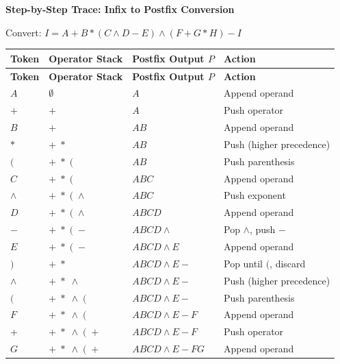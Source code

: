 \documentclass[12pt,a4paper]{article}
\renewcommand{\arraystretch}{1.45}
\begin{document}
\par\smallskip\noindent \textbf{Step-by-Step Trace: Infix to Postfix Conversion}\par\nobreak
Convert: $I = A + B * (C \wedge D - E) \wedge (F + G * H) - I$
\par\vspace{4pt}
\begingroup
\setlength{\tabcolsep}{4.5pt}
\setlength{\extrarowheight}{1.5pt}
\renewcommand{\arraystretch}{1.15}
\begingroup
\setlength{\LTleft}{0pt}
\setlength{\LTright}{0pt}
\begin{longtable}{|B{1.6cm}|B{2.8cm}|>{\small\raggedright\arraybackslash}m{\dimexpr(\linewidth-1.6cm-2.8cm-3.2cm-8\arrayrulewidth)/1\relax}|B{3.2cm}|}
\hline
\textbf{Token} & \textbf{Operator Stack} & \textbf{Postfix Output $P$} & \textbf{Action} \\
\hline
\endfirsthead
\hline
\textbf{Token} & \textbf{Operator Stack} & \textbf{Postfix Output $P$} & \textbf{Action} \\
\hline
\endhead
\hline
\endfoot
\endlastfoot
$A$ & $\emptyset$ & $A$ & Append operand \\
$+$ & $+$ & $A$ & Push operator \\
$B$ & $+$ & $A B$ & Append operand \\
$*$ & $+ \; *$ & $A B$ & Push (higher precedence) \\
$($ & $+ \; * \; ($ & $A B$ & Push parenthesis \\
$C$ & $+ \; * \; ($ & $A B C$ & Append operand \\
$\wedge$ & $+ \; * \; ( \; \wedge$ & $A B C$ & Push exponent \\
$D$ & $+ \; * \; ( \; \wedge$ & $A B C D$ & Append operand \\
$-$ & $+ \; * \; ( \; -$ & $A B C D \wedge$ & Pop $\wedge$, push $-$ \\
$E$ & $+ \; * \; ( \; -$ & $A B C D \wedge E$ & Append operand \\
$)$ & $+ \; *$ & $A B C D \wedge E -$ & Pop until $($, discard \\
$\wedge$ & $+ \; * \; \wedge$ & $A B C D \wedge E -$ & Push (higher precedence) \\
$($ & $+ \; * \; \wedge \; ($ & $A B C D \wedge E -$ & Push parenthesis \\
$F$ & $+ \; * \; \wedge \; ($ & $A B C D \wedge E - F$ & Append operand \\
$+$ & $+ \; * \; \wedge \; ( \; +$ & $A B C D \wedge E - F$ & Push operator \\
$G$ & $+ \; * \; \wedge \; ( \; +$ & $A B C D \wedge E - F G$ & Append operand \\

\end{longtable}
\end{document}
